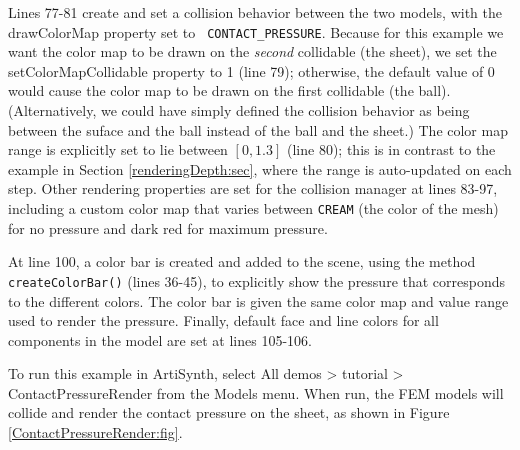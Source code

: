 Lines 77-81 create and set a collision behavior between the two
models, with the {\sf drawColorMap} property set to {\tt
CONTACT\_PRESSURE}. Because for this example we want the color map to
be drawn on the {\it second} collidable (the sheet), we set the {\sf
setColorMapCollidable} property to 1 (line 79); otherwise, the default
value of 0 would cause the color map to be drawn on the first
collidable (the ball). (Alternatively, we could have simply defined the
collision behavior as being between the suface and the ball instead of
the ball and the sheet.) The color map range is explicitly set to lie
between $[0, 1.3]$ (line 80); this is in contrast to the example in
Section \ref{renderingDepth:sec}, where the range is auto-updated on
each step.  Other rendering properties are set for the collision
manager at lines 83-97, including a custom color map that varies
between {\tt CREAM} (the color of the mesh) for no pressure and dark
red for maximum pressure.

At line 100, a color bar is created and added to the scene, using the
method {\tt createColorBar()} (lines 36-45), to explicitly show the
pressure that corresponds to the different colors. The color bar is
given the same color map and value range used to render the
pressure. Finally, default face and line colors for all components in
the model are set at lines 105-106.

To run this example in ArtiSynth, select {\sf All demos > tutorial >
ContactPressureRender} from the {\sf Models} menu. When run, the FEM
models will collide and render the contact pressure on the sheet, as
shown in Figure \ref{ContactPressureRender:fig}.
